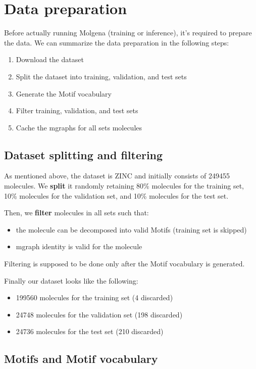 \documentclass{article}
\begin{document}
\section{Data preparation}

Before actually running Molgena (training or inference), it's required to prepare the data.
We can summarize the data preparation in the following steps:

\begin{enumerate}
\item Download the dataset
\item Split the dataset into training, validation, and test sets
\item Generate the Motif vocabulary
\item Filter training, validation, and test sets
\item Cache the mgraphs for all sets molecules
\end{enumerate}

\subsection{Dataset splitting and filtering}

As mentioned above, the dataset is ZINC and initially consists of 249455 molecules.
We \textbf{split} it randomly retaining 80\% molecules for the training set, 10\% molecules for the validation set, and 10\% molecules for the test set.

Then, we \textbf{filter} molecules in all sets such that:
\begin{itemize}
    \item the molecule can be decomposed into valid Motifs (training set is skipped)
    \item mgraph identity is valid for the molecule
\end{itemize}
Filtering is supposed to be done only after the Motif vocabulary is generated.

Finally our dataset looks like the following:
\begin{itemize}
    \item 199560 molecules for the training set (4 discarded)
    \item 24748 molecules for the validation set (198 discarded)
    \item 24736 molecules for the test set (210 discarded)
\end{itemize}

\subsection{Motifs and Motif vocabulary}
\end{document}

